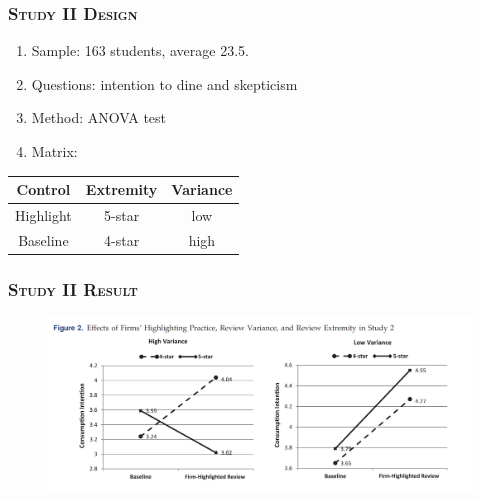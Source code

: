 \documentclass{../presentation}
\begin{document}
    \begin{frame}
        \frametitle{\textsc{Study II Design}}

            \begin{enumerate}
                \item Sample: 163 students, average 23.5.
                \item Questions: intention to dine and skepticism
                \item Method: ANOVA test
                \item Matrix:
            \end{enumerate}

            \begin{table}
                \scriptsize
                \begin{tabular}{c|c|c}
                    \toprule
                    Control & Extremity & Variance \\
                    \midrule
                    Highlight & 5-star & low \\
                    Baseline & 4-star & high \\
                    \bottomrule
                \end{tabular}
            \end{table}

    \end{frame}

    \begin{frame}
        \frametitle{\textsc{Study II Result}}

        \begin{figure}
            \includegraphics[width=0.8\linewidth]{pre04-imgs/pre04-2.png}
        \end{figure}

    \end{frame}
\end{document}
